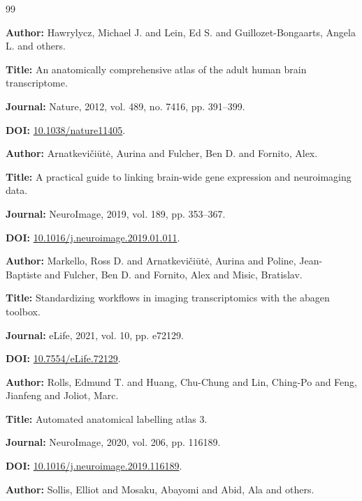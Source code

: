 \documentclass[10pt,twocolumn]{article}
\begin{document}
\begin{thebibliography}{99}

\textbf{Author:} Hawrylycz, Michael J. and Lein, Ed S. and Guillozet-Bongaarts, Angela L. and others.

\textbf{Title:} An anatomically comprehensive atlas of the adult human brain transcriptome.

\textbf{Journal:} Nature, 2012, vol. 489, no. 7416, pp. 391--399.

\textbf{DOI:} \href{https://doi.org/10.1038/nature11405}{10.1038/nature11405}.

\textbf{Author:} Arnatkevi{\v c}i{\=u}t{\.e}, Aurina and Fulcher, Ben D. and Fornito, Alex.

\textbf{Title:} A practical guide to linking brain-wide gene expression and neuroimaging data.

\textbf{Journal:} NeuroImage, 2019, vol. 189, pp. 353--367.

\textbf{DOI:} \href{https://doi.org/10.1016/j.neuroimage.2019.01.011}{10.1016/j.neuroimage.2019.01.011}.

\textbf{Author:} Markello, Ross D. and Arnatkevi{\v c}i{\=u}t{\.e}, Aurina and Poline, Jean-Baptiste and Fulcher, Ben D. and Fornito, Alex and Misic, Bratislav.

\textbf{Title:} Standardizing workflows in imaging transcriptomics with the abagen toolbox.

\textbf{Journal:} eLife, 2021, vol. 10, pp. e72129.

\textbf{DOI:} \href{https://doi.org/10.7554/eLife.72129}{10.7554/eLife.72129}.

\textbf{Author:} Rolls, Edmund T. and Huang, Chu-Chung and Lin, Ching-Po and Feng, Jianfeng and Joliot, Marc.

\textbf{Title:} Automated anatomical labelling atlas 3.

\textbf{Journal:} NeuroImage, 2020, vol. 206, pp. 116189.

\textbf{DOI:} \href{https://doi.org/10.1016/j.neuroimage.2019.116189}{10.1016/j.neuroimage.2019.116189}.

\textbf{Author:} Sollis, Elliot and Mosaku, Abayomi and Abid, Ala and others.


\end{thebibliography}
\end{document}
